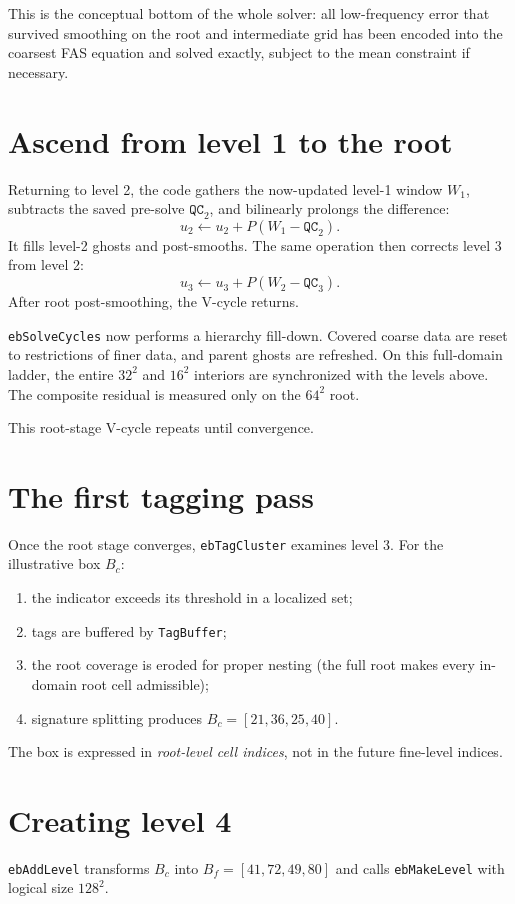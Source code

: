 \documentclass[11pt,oneside,openany]{book}
\newcommand{\code}[1]{\textnormal{\texttt{#1}}}
\begin{document}
This is the conceptual bottom of the whole solver: all low-frequency error that survived smoothing on the root and intermediate grid has been encoded into the coarsest FAS equation and solved exactly, subject to the mean constraint if necessary.

\section{Ascend from level 1 to the root}
Returning to level 2, the code gathers the now-updated level-1 window $W_1$, subtracts the saved pre-solve \ensuremath{\mathtt{QC}_{2}}, and bilinearly prolongs the difference:
\[
 u_2\leftarrow u_2+P(W_1-\ensuremath{\mathtt{QC}_{2}}).
\]
It fills level-2 ghosts and post-smooths. The same operation then corrects level 3 from level 2:
\[
 u_3\leftarrow u_3+P(W_2-\ensuremath{\mathtt{QC}_{3}}).
\]
After root post-smoothing, the V-cycle returns.

\code{ebSolveCycles} now performs a hierarchy fill-down. Covered coarse data are reset to restrictions of finer data, and parent ghosts are refreshed. On this full-domain ladder, the entire $32^2$ and $16^2$ interiors are synchronized with the levels above. The composite residual is measured only on the $64^2$ root.

This root-stage V-cycle repeats until convergence.

\section{The first tagging pass}
Once the root stage converges, \code{ebTagCluster} examines level 3. For the illustrative box $B_c$:
\begin{enumerate}[label=\arabic*.]
\item the indicator exceeds its threshold in a localized set;
\item tags are buffered by \code{TagBuffer};
\item the root coverage is eroded for proper nesting (the full root makes every in-domain root cell admissible);
\item signature splitting produces $B_c=[21,36,25,40]$.
\end{enumerate}
The box is expressed in \emph{root-level cell indices}, not in the future fine-level indices.

\section{Creating level 4}
\code{ebAddLevel} transforms $B_c$ into $B_f=[41,72,49,80]$ and calls \code{ebMakeLevel} with logical size $128^2$.
\end{document}
